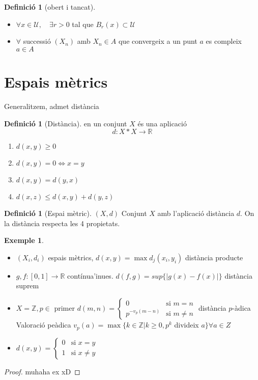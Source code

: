 \documentclass{article}
\theoremstyle{definition}
\newtheorem{definition}[theorem]{Definició}
\newtheorem{example}[theorem]{Exemple}
\newcommand{\R}{\mathbb{R}}
\newcommand{\Z}{\mathbb{Z}}
\newcommand{\U}{\mathcal{U}}
\begin{document}
\begin{definition}[obert i tancat]
\begin{itemize}
\item[obert] $\forall x \in \U, \quad \exists r > 0$ tal que $B_r(x) \subset \U$
\item[tancat] $\forall$ successió $(X_n)$ amb $X_n \in A$ que convergeix a un punt $a$ es compleix $a \in A$
\end{itemize}
\end{definition}

\section{Espais mètrics}
Generalitzem, admet distància
\begin{definition}[Distància]
en un conjunt $X$ és una aplicació
$$d:X*X\to\R$$
\begin{enumerate}[label=\bfseries D\arabic*)]
\item $d(x, y) \geq 0$
\item $d(x, y) = 0 \Leftrightarrow x = y$
\item $d(x, y) = d(y, x)$
\item $d(x, z) \leq d(x, y) + d(y, z)$
\end{enumerate}
\end{definition}

\begin{definition}[Espai mètric]
$(X, d)$ Conjunt $X$ amb l'aplicació distància $d$. On la distància respecta les 4 propietats.
\end{definition}

\begin{example}
\begin{itemize}
\item $(X_i, d_i)$ espais mètrics, $d(x, y) = \max{d_j(x_i, y_i)}$ distància producte
\item $g, f: [0, 1] \to \R$ contínua'inues. $d(f, g) = sup\{|g(x) - f(x)|\}$ distància suprem
\item $X = \Z, p \in$ primer $d(m, n) = \left\{\begin{array}{ll}0 &\text{si } m=n\\p^{-v_p(m-n)} &\text{si } m\neq n\end{array}\right.$ distància $p$-àdica
	\subitem Valoració peàdica $v_p(a) = \max\{k\in \Z| k \geq 0, p^k$ divideix $a \} \forall a \in Z$
\item $d(x,y) = \left\{\begin{array}{ll}0&\text{si }x=y\\1&\text{si }x\neq y\end{array}\right.$
\end{itemize}
\end{example}

\begin{proof}
muhaha ex xD
\end{proof}
\end{document}
